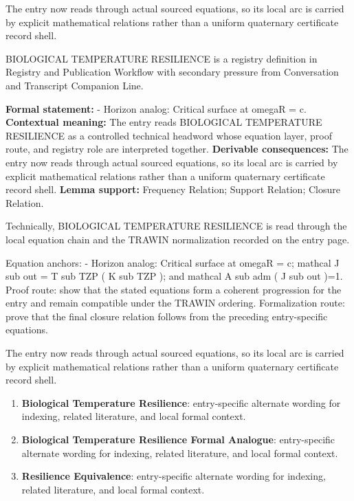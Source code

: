 The entry now reads through actual sourced equations, so its local arc is carried by explicit mathematical relations rather than a uniform quaternary certificate record shell.
\clearpage


\begingroup\small
{}
BIOLOGICAL TEMPERATURE RESILIENCE is a registry definition in Registry and Publication Workflow with secondary pressure from Conversation and Transcript Companion Line.

\begingroup\footnotesize\setlength{\emergencystretch}{3em}\sloppy
\textbf{Formal statement:} - Horizon analog: Critical surface at omegaR = c. \textbf{Contextual meaning:} The entry reads BIOLOGICAL TEMPERATURE RESILIENCE as a controlled technical headword whose equation layer, proof route, and registry role are interpreted together. \textbf{Derivable consequences:} The entry now reads through actual sourced equations, so its local arc is carried by explicit mathematical relations rather than a uniform quaternary certificate record shell. \textbf{Lemma support:} Frequency Relation; Support Relation; Closure Relation.\par
\endgroup

Technically, BIOLOGICAL TEMPERATURE RESILIENCE is read through the local equation chain and the TRAWIN normalization recorded on the entry page.

Equation anchors: - Horizon analog: Critical surface at omegaR = c; mathcal J sub out = T sub TZP ( K sub TZP ); and mathcal A sub adm ( J sub out )=1. Proof route: show that the stated equations form a coherent progression for the entry and remain compatible under the TRAWIN ordering. Formalization route: prove that the final closure relation follows from the preceding entry-specific equations.

The entry now reads through actual sourced equations, so its local arc is carried by explicit mathematical relations rather than a uniform quaternary certificate record shell.
\endgroup

\begin{enumerate}[leftmargin=1.6em,itemsep=6pt,topsep=4pt]
\item \textbf{Biological Temperature Resilience}: entry-specific alternate wording for indexing, related literature, and local formal context.
\item \textbf{Biological Temperature Resilience Formal Analogue}: entry-specific alternate wording for indexing, related literature, and local formal context.
\item \textbf{Resilience Equivalence}: entry-specific alternate wording for indexing, related literature, and local formal context.
\end{enumerate}

